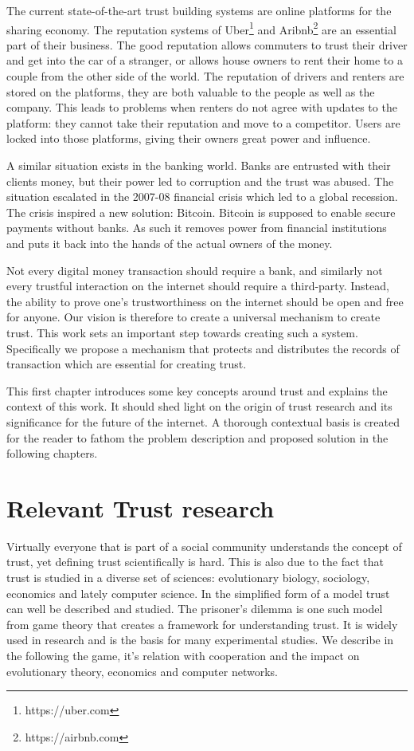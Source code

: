 The current state-of-the-art trust building systems are online platforms for the sharing economy.
The reputation systems of Uber\footnote{https://uber.com} and Aribnb\footnote{https://airbnb.com} are
an essential part of their business. The good reputation allows commuters to trust their driver and
get into the car of a stranger, or allows house owners to rent their home to a couple from the other
side of the world.\cite{ert2016trust} The reputation of drivers and renters are stored on the platforms, they are both
valuable to the people as well as the company. This leads to problems when renters do not agree with
updates to the platform: they cannot take their reputation and move to a competitor. Users are locked
into those platforms, giving their owners great power and influence.

A similar situation exists in the banking world. Banks are entrusted with their clients money, but 
their power led to corruption and the trust was abused. The situation escalated in the 2007-08 
financial crisis\cite{financial_crisis} which led to a global recession. The crisis inspired a new solution: Bitcoin\cite{nakamoto2008bitcoin}. Bitcoin
is supposed to enable secure payments without banks. As such it removes power from financial 
institutions and puts it back into the hands of the actual owners of the money. 

Not every digital money transaction should require a bank, and similarly not every trustful
interaction on the internet should require a third-party. Instead, the ability to prove one's trustworthiness
on the internet should be open and free for anyone. Our vision is therefore to create a universal
mechanism to create trust. This work sets an important 
step towards creating such a system. Specifically we propose a mechanism that protects and 
distributes the records of transaction which are essential for creating trust. 

This first chapter introduces some key concepts around trust and explains the context of this work.
It should shed light on the origin of trust research and its significance for the future of the 
internet. A thorough contextual basis is created for the reader to fathom the problem description
and proposed solution in the following chapters.

\section{Relevant Trust research}
Virtually everyone that is part of a social community understands the concept of trust, yet defining
trust scientifically is hard. This is also due to the fact that trust is studied in a diverse set 
of sciences: evolutionary biology, sociology, economics and lately computer science\cite{shockley2015interdisciplinary}. In the simplified
form of a model trust can well be described and studied. The prisoner's 
dilemma\cite{rapoport1965prisoner} is one such model from game theory that creates a framework for 
understanding trust. It is widely used in research and is the basis for many experimental studies.
We describe in the following the game, it's relation with cooperation and the impact on evolutionary
theory, economics and computer networks.

